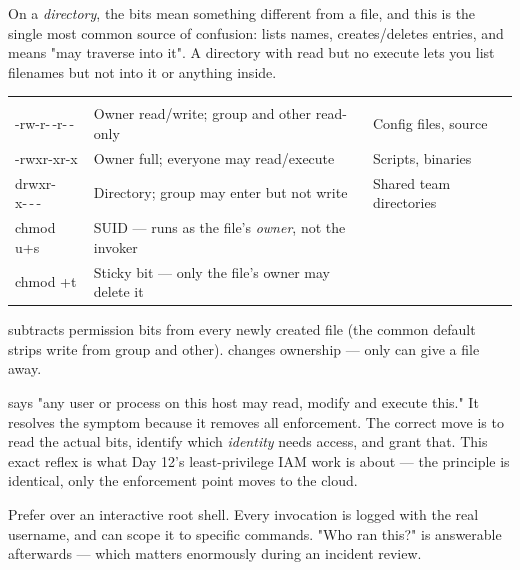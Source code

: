  On a \emph{directory}, the bits mean something different from a file, and this is the single most common source of confusion:  lists names,  creates/deletes entries, and  means "may traverse into it". A directory with read but no execute lets you list filenames but not  into it or  anything inside.

\begin{center}\small
\wbrowcolors
\begin{tabularx}{\linewidth}{@{}L{28mm} X L{30mm}@{}}
 &  & \\
-rw-r-\,-r-\,- & Owner read/write; group and other read-only & Config files, source\\
-rwxr-xr-x & Owner full; everyone may read/execute & Scripts, binaries\\
drwxr-x-\,-\,- & Directory; group may enter but not write & Shared team directories\\
chmod u+s & SUID --- runs as the file's \emph{owner}, not the invoker & \\
chmod +t & Sticky bit --- only the file's owner may delete it & \\
\end{tabularx}
\end{center}

 subtracts permission bits from every newly created file (the common default  strips write from group and other).  changes ownership --- only  can give a file away.

\begin{secwarn}
 says "any user or process on this host may read, modify and execute this." It resolves the symptom because it removes all enforcement. The correct move is to read the actual bits, identify which \emph{identity} needs access, and grant that. This exact reflex is what Day 12's least-privilege IAM work is about --- the principle is identical, only the enforcement point moves to the cloud.
\end{secwarn}

\begin{prodtip}
Prefer  over an interactive root shell. Every invocation is logged with the real username, and  can scope it to specific commands. "Who ran this?" is answerable afterwards --- which matters enormously during an incident review.
\end{prodtip}

